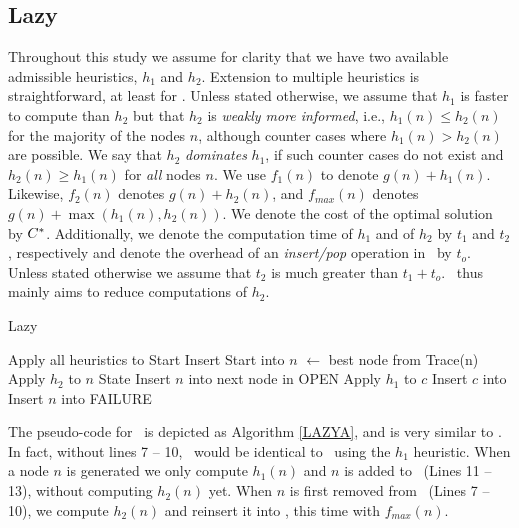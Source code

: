 \subsection{Lazy \astar}

Throughout this study we assume for clarity that we have two available
admissible heuristics, $h_1$ and $h_2$.
Extension to multiple heuristics is straightforward, at least for \lazyastar.
Unless stated otherwise, we assume that $h_1$ is faster to compute than $h_2$
but that $h_2$ is {\em weakly more informed}, i.e., $h_1(n) \leq h_2(n)$ for
the majority of the nodes $n$, although counter cases where $h_1(n) > h_2(n)$
are possible.
We say that $h_2$ {\em dominates} $h_1$, if such counter cases do not
exist and $h_2(n) \geq h_1(n)$ for {\em all} nodes $n$.
We use $f_1(n)$ to denote $g(n)+h_1(n)$. Likewise, $f_2(n)$
denotes $g(n)+h_2(n)$, and $f_{max}(n)$ denotes $g(n) + \max(h_1(n),h_2(n))$.
We denote the cost of the optimal solution by $C^\ast$. Additionally, we
denote the computation time of $h_1$ and of $h_2$ by $t_1$ and $t_2$,
respectively and denote the overhead of an {\em insert/pop} operation in
\OPEN~by $t_o$. Unless stated otherwise we assume that $t_2$ is much greater
than $t_1 + t_o$. \lazyastar~thus mainly aims to reduce computations of $h_2$.

\begin{algorithm}[h]
\caption{Lazy \astar}
\begin{algorithmic}[1]
    \State Apply all heuristics to Start
    \State Insert Start into \OPEN
        \State $n$ $\gets$ best node from \OPEN
            \Return Trace(n)
        \EndIf
            \State Apply $h_2$ to $n$
            State Insert $n$ into \OPEN
			 \Comment next node in OPEN
        \EndIf
            \State Apply $h_1$ to $c$
            \State Insert $c$ into \OPEN
        \EndFor
        \State Insert $n$ into \CLOSED
    \EndWhile
    \Return FAILURE
\EndProcedure
\end{algorithmic}
\label{LAZYA}
\end{algorithm}

The pseudo-code for  \lazyastar~is depicted as Algorithm \ref{LAZYA}, and is
very similar to \astar.
In fact, without lines 7 -- 10, \lazyastar~would be identical to
\astar~using the $h_1$ heuristic.
When a node $n$ is generated we only compute $h_1(n)$ and $n$ is added to
\OPEN ~(Lines 11 -- 13), without computing $h_2(n)$ yet.
When $n$ is first removed from \OPEN~(Lines 7 -- 10), we compute $h_2(n)$ and
reinsert it into \OPEN, this time with $f_{max}(n)$.%

